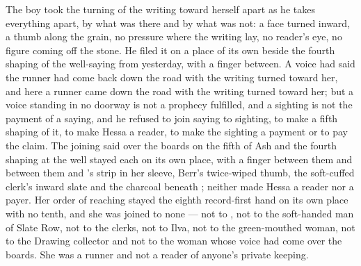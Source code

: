 The boy took the turning of the writing toward herself apart as he takes everything apart, by what was there and by what was not: a face turned inward, a thumb along the grain, no pressure where the writing lay, no reader's eye, no figure coming off the stone. He filed it on a place of its own beside the fourth shaping of the well-saying from yesterday, with a finger between. A voice had said the runner had come back down the road with the writing turned toward her, and here a runner came down the road with the writing turned toward her; but a voice standing in no doorway is not a prophecy fulfilled, and a sighting is not the payment of a saying, and he refused to join saying to sighting, to make a fifth shaping of it, to make Hessa a reader, to make the sighting a payment or to pay the claim. The joining said over the boards on the fifth of Ash and the fourth shaping at the well stayed each on its own place, with a finger between them and between them and 's strip in her sleeve, Berr's twice-wiped thumb, the soft-cuffed clerk's inward slate and the charcoal beneath ; neither made Hessa a reader nor  a payer. Her order of reaching stayed the eighth record-first hand on its own place with no tenth, and she was joined to none --- not to , not to the soft-handed man of Slate Row, not to the clerks, not to Ilva, not to the green-mouthed woman, not to the Drawing collector and not to the woman whose voice had come over the boards. She was a runner and not a reader of anyone's private keeping.

\scenebreak

